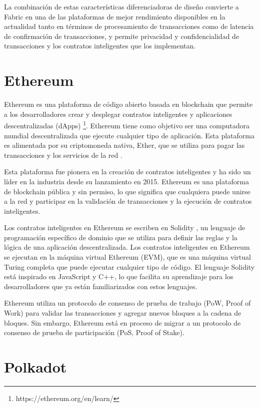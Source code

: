 \documentclass{article}
\begin{document}
La combinación de estas características diferenciadoras de diseño convierte a Fabric en una de las plataformas de mejor rendimiento disponibles en la actualidad tanto en términos de procesamiento de transacciones como de latencia de confirmación de transacciones, y permite privacidad y confidencialidad de transacciones y los contratos inteligentes que los implementan.

\section{Ethereum}

Ethereum es una plataforma de código abierto basada en blockchain que permite a los desarrolladores crear y desplegar contratos inteligentes y aplicaciones descentralizadas (dApps) \footnote{https://ethereum.org/en/learn/}. Ethereum tiene como objetivo ser una computadora mundial descentralizada que ejecute cualquier tipo de aplicación. Esta plataforma es alimentada por su criptomoneda nativa, Ether, que se utiliza para pagar las transacciones y los servicios de la red \cite{buterin2013ethereum}.

Esta plataforma fue pionera en la creación de contratos inteligentes y ha sido un líder en la industria desde su lanzamiento en 2015. Ethereum es una plataforma de blockchain pública y sin permiso, lo que significa que cualquiera puede unirse a la red y participar en la validación de transacciones y la ejecución de contratos inteligentes. 

Los contratos inteligentes en Ethereum se escriben en Solidity \cite{dannen2017introducing}, un lenguaje de programación específico de dominio que se utiliza para definir las reglas y la lógica de una aplicación descentralizada. Los contratos inteligentes en Ethereum se ejecutan en la máquina virtual Ethereum (EVM), que es una máquina virtual Turing completa que puede ejecutar cualquier tipo de código. El lenguaje Solidity está inspirado en JavaScript y C++, lo que facilita su aprendizaje para los desarrolladores que ya están familiarizados con estos lenguajes.

Ethereum utiliza un protocolo de consenso de prueba de trabajo (PoW, Proof of Work) para validar las transacciones y agregar nuevos bloques a la cadena de bloques. Sin embargo, Ethereum está en proceso de migrar a un protocolo de consenso de prueba de participación (PoS, Proof of Stake). 

\section{Polkadot}
\end{document}
